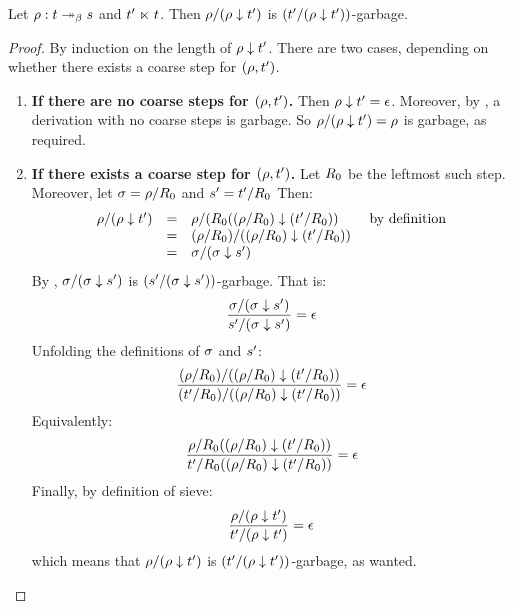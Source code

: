 \begin{lemma}
Let $\rho : t \mathrel{\twoheadrightarrow_\beta} s$ and $t' \mathrel{\ltimes} t$.
Then $\rho/(\rho \downarrow t')$ is $(t'/(\rho \downarrow t'))$-garbage.
\end{lemma}
\begin{proof}
By induction on the length of $\rho \downarrow t'$.
There are two cases, depending on whether there exists a coarse step for $(\rho,t')$.
\begin{enumerate}
\item {\bf If there are no coarse steps for $(\rho,t')$.}
  Then $\rho \downarrow t' = \epsilon$.
  Moreover, by , a derivation with no
  coarse steps is garbage. So $\rho/(\rho \downarrow t') = \rho$
  is garbage, as required.
\item {\bf If there exists a coarse step for $(\rho,t')$.}
  Let $R_0$ be the leftmost such step.
  Moreover, let $\sigma = \rho/R_0$ and $s' = t'/R_0$
  Then:
  \[
    \begin{array}{rcll}
    \rho/(\rho \downarrow t')
    & = & \rho/(R_0((\rho/R_0) \downarrow (t'/R_0)) & \text{ by definition} \\
    & = & (\rho/R_0)/((\rho/R_0) \downarrow (t'/R_0)) \\
    & = & \sigma/(\sigma \downarrow s') \\
    \end{array}
  \]
  By \ih, $\sigma/(\sigma \downarrow s')$ is $(s'/(\sigma \downarrow s'))$-garbage.
  That is:
  \[
    \frac{
      \sigma/(\sigma \downarrow s')
    }{
      s'/(\sigma \downarrow s')
    } = \epsilon
  \]
  Unfolding the definitions of $\sigma$ and $s'$:
  \[
    \frac{
      (\rho/R_0)/((\rho/R_0) \downarrow (t'/R_0))
    }{
      (t'/R_0)/((\rho/R_0) \downarrow (t'/R_0))
    } = \epsilon
  \]
  Equivalently:
  \[
    \frac{
      \rho/R_0((\rho/R_0) \downarrow (t'/R_0))
    }{
      t'/R_0((\rho/R_0) \downarrow (t'/R_0))
    } = \epsilon
  \]
  Finally, by definition of sieve:
  \[
    \frac{
      \rho/(\rho \downarrow t')
    }{
      t'/(\rho \downarrow t')
    } = \epsilon
  \]
  which means that $\rho/(\rho \downarrow t')$ is $(t'/(\rho \downarrow t'))$-garbage,
  as wanted.
\end{enumerate}
\end{proof}


